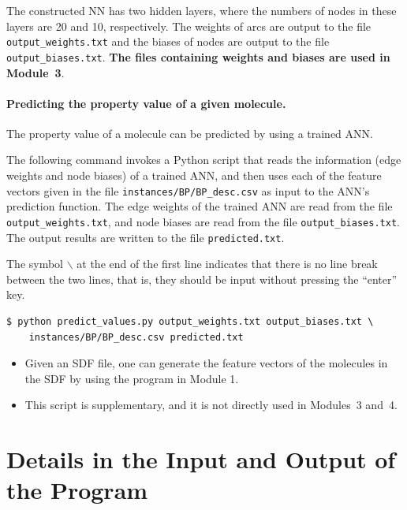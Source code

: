 \documentclass[11pt,titlepage,dvipdfmx,twoside]{book}
\begin{document}
The constructed NN has two hidden layers,
where the numbers of nodes in these layers
are 20 and 10, respectively.
The weights of arcs are output to the file \verb|output_weights.txt|
and the biases of nodes are output to the file
\verb|output_biases.txt|.  
%
{\bf The files containing weights and biases are used in Module~3}. 


\paragraph{Predicting the property value of a given molecule.}
The property value of a molecule can be predicted by using a trained ANN.

The following command invokes a Python  script that
reads the information (edge weights and node biases)
of a trained ANN, and then uses each of the feature vectors
given in the file \verb|instances/BP/BP_desc.csv| as input to the
ANN's prediction function.
The edge weights of the trained ANN are read from the file \verb|output_weights.txt|,
and node biases are read from the file \verb|output_biases.txt|.
The output results 
are written to the file \verb|predicted.txt|. 

\begin{oframed}
  {\small
\noindent The symbol $\backslash$ at the end of the first line indicates that there
is no line break between the two lines, that is, they should be input without 
pressing the ``enter'' key.
\begin{verbatim}
$ python predict_values.py output_weights.txt output_biases.txt \
    instances/BP/BP_desc.csv predicted.txt
\end{verbatim}
}
  \end{oframed}

\begin{itemize}
\item Given an SDF file,
  one can generate the feature vectors of the molecules in the SDF
  by using the program in Module 1.
\item This script is supplementary, and it is not directly used in Modules~3 and~4. 
\end{itemize}


\section{Details in the Input and Output of the Program}
\label{chap:io2}
\end{document}
